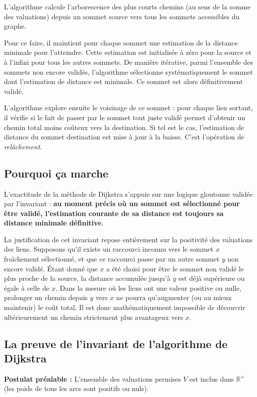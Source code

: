\documentclass[11pt,a4paper]{report}
\begin{document}
	L'algorithme calcule l'arborescence des plus courts chemins (au sens de la somme des valuations) depuis un sommet source vers tous les sommets accessibles du graphe. 
	
	Pour ce faire, il maintient pour chaque sommet une estimation de la distance minimale pour l'atteindre. Cette estimation est initialisée à zéro pour la source et à l'infini pour tous les autres sommets. De manière itérative, parmi l'ensemble des sommets non encore \og{}validés\fg{}, l'algorithme sélectionne systématiquement le sommet dont l'estimation de distance est minimale. Ce sommet est alors définitivement validé. 
	
	L'algorithme explore ensuite le voisinage de ce sommet : pour chaque lien sortant, il vérifie si le fait de passer par le sommet tout juste validé permet d'obtenir un chemin total moins coûteux vers la destination. Si tel est le cas, l'estimation de distance du sommet destination est mise à jour à la baisse. C'est l'opération de \textit{relâchement}.
	
	\subsection{Pourquoi ça marche}
	L'exactitude de la méthode de Dijkstra s'appuie sur une logique gloutonne validée par l'invariant : \textbf{au moment précis où un sommet est sélectionné pour être validé, l'estimation courante de sa distance est toujours sa distance minimale définitive}.
	
	La justification de cet invariant repose entièrement sur la positivité des valuations des liens. Supposons qu'il existe un raccourci inconnu vers le sommet $x$ fraîchement sélectionné, et que ce raccourci passe par un autre sommet $y$ non encore validé. Étant donné que $x$ a été choisi pour être le sommet non validé le plus \og{}proche\fg{} de la source, la distance accumulée jusqu'à $y$ est déjà supérieure ou égale à celle de $x$. Dans la mesure où les liens ont une valeur positive ou nulle, prolonger un chemin depuis $y$ vers $x$ ne pourra qu'augmenter (ou au mieux maintenir) le coût total. Il est donc mathématiquement impossible de découvrir ultérieurement un chemin strictement plus avantageux vers $x$.
	
	\subsection{La preuve de l'invariant de l'algorithme de Dijkstra}
	
	\textbf{Postulat préalable :} L'ensemble des valuations permises $V$ est inclus dans $\mathbb{R}^+$ (les poids de tous les arcs sont positifs ou nuls).
	
\end{document}
